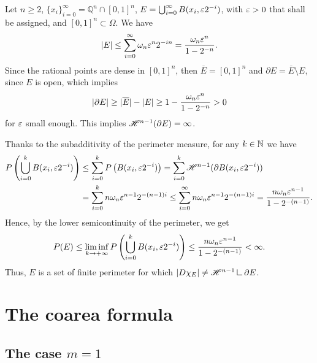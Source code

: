 \begin{example} \label{ex:Giusti_cheese} 
Let $n \ge 2$, $\{ x_{i} \}_{i = 0}^{\infty} = \mathbb{Q}^{n} \cap [0, 1]^{n}$, $E = \bigcup_{i = 0}^{\infty} B(x_{i}, \varepsilon 2^{-i})$, with $\varepsilon > 0$ that shall be assigned, and $[0, 1]^{n} \subset \Omega$. We have
\[ |E| \le \sum_{i = 0}^{\infty} \omega_{n} \varepsilon^{n} 2^{-i n} = \frac{\omega_{n} \varepsilon^{n}}{1 - 2^{- n}}. \]
Since the rational points are dense in $[0, 1]^{n}$, then $\overline{E} = [0, 1]^{n}$ and $\partial E = \overline{E} \setminus E$, since $E$ is open, which implies
\[ |\partial E| \ge |\overline{E}| - |E| \ge 1 - \frac{\omega_{n} \varepsilon^{n}}{1 - 2^{- n}} > 0 \]
for $\varepsilon$ small enough. This implies $\mathscr{H}^{n - 1}(\partial E) = \infty$. 

Thanks to the subadditivity of the perimeter measure, for any $k \in \mathbb{N}$ we have
\begin{align*} P\left ( \bigcup_{i = 0}^{k} B(x_{i}, \varepsilon 2^{-i}) \right ) & \le \sum_{i = 0}^{k} P \left ( B(x_{i}, \varepsilon 2^{-i}) \right ) =  \sum_{i = 0}^{k} \mathscr{H}^{n - 1}(\partial B(x_{i}, \varepsilon 2^{- i})) \\
& = \sum_{i = 0}^{k} n \omega_{n} \varepsilon^{n - 1} 2^{- (n - 1) i} \le \sum_{i = 0}^{\infty} n \omega_{n} \varepsilon^{n - 1} 2^{- (n - 1) i} = \frac{n \omega_{n} \varepsilon^{n - 1}}{1 - 2^{- (n - 1)}}.
\end{align*}
Hence, by the lower semicontinuity of the perimeter, we get
\begin{equation*}
P(E) \le \liminf_{k \to + \infty} P\left ( \bigcup_{i = 0}^{k} B(x_{i}, \varepsilon 2^{-i}) \right ) \le \frac{n \omega_{n} \varepsilon^{n - 1}}{1 - 2^{- (n - 1)}} < \infty.
\end{equation*}
Thus, $E$ is a set of finite perimeter for which $|D \chi_{E}| \neq \Haus{n - 1} \res \partial E$. 
\end{example}

















\section{The coarea formula}

\subsection{The case $m = 1$}

